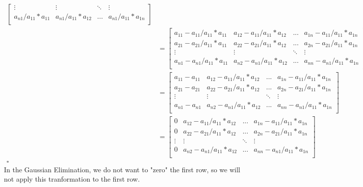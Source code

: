 \documentclass[10pt,a4paper]{article}
\begin{document}
\begin{align*}
\begin{bmatrix}
		\vdots & \vdots & \ddots & \vdots \\
		a_{n1} / a_{11} * a_{11} & 	a_{n1} / a_{11} * a_{12} & ... & a_{n1} / a_{11} * a_{1n}\\
		\end{bmatrix}\\
		&= \begin{bmatrix}
		a_{11} - a_{11} / a_{11} * a_{11} & a_{12} - a_{11} / a_{11} * a_{12} & ... & a_{1n} - a_{11} / a_{11} * a_{1n}\\
		a_{21} - a_{21} / a_{11} * a_{11} & a_{22} - a_{21} / a_{11} * a_{12} & ... & a_{2n} - a_{21} / a_{11} * a_{1n}\\
		\vdots & \vdots & \ddots & \vdots \\
		a_{n1} - a_{n1} / a_{11} * a_{11} & a_{n2} - a_{n1} / a_{11} * a_{12} & ... & a_{nn} - a_{n1} / a_{11} * a_{1n}\\
		\end{bmatrix}\\
		&= \begin{bmatrix}
		a_{11} - a_{11} & a_{12} - a_{11} / a_{11} * a_{12} & ... & a_{1n} - a_{11} / a_{11} * a_{1n}\\
		a_{21} - a_{21} & a_{22} - a_{21} / a_{11} * a_{12} & ... & a_{2n} - a_{21} / a_{11} * a_{1n}\\
		\vdots & \vdots & \ddots & \vdots \\
		a_{n1} - a_{n1} & a_{n2} - a_{n1} / a_{11} * a_{12} & ... & a_{nn} - a_{n1} / a_{11} * a_{1n}\\
		\end{bmatrix}\\
		&= \begin{bmatrix}
		0 & a_{12} - a_{11} / a_{11} * a_{12} & ... & a_{1n} - a_{11} / a_{11} * a_{1n}\\
		0 & a_{22} - a_{21} / a_{11} * a_{12} & ... & a_{2n} - a_{21} / a_{11} * a_{1n}\\
		\vdots & \vdots & \ddots & \vdots \\
		0 & a_{n2} - a_{n1} / a_{11} * a_{12} & ... & a_{nn} - a_{n1} / a_{11} * a_{1n}\\
		\end{bmatrix}\\
		\square
	\end{align*}
		In the Gaussian Elimination, we do not want to "zero" the first row, so we will not apply this tranformation to the first row.
\end{document}
